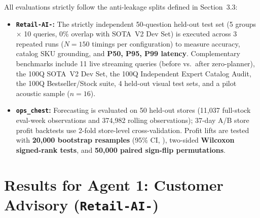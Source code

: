 All evaluations strictly follow the anti-leakage splits defined in Section~3.3:
\begin{itemize}
    \item \textbf{\texttt{Retail-AI-}:} The strictly independent 50-question held-out test set (5 groups $\times$ 10 queries, 0\% overlap with SOTA~V2 Dev Set) is executed across 3 repeated runs ($N=150$ timings per configuration) to measure accuracy, catalog SKU grounding, and \textbf{P50, P95, P99 latency}. Complementary benchmarks include 11 live streaming queries (before vs.\ after zero-planner), the 100Q SOTA~V2 Dev Set, the 100Q Independent Expert Catalog Audit, the 100Q Bestseller/Stock suite, 4 held-out visual test sets, and a pilot acoustic sample ($n=16$).
    \item \textbf{\texttt{ops\_chest}:} Forecasting is evaluated on 50 held-out stores (11,037 full-stock eval-week observations and 374,982 rolling observations); 37-day A/B store profit backtests use 2-fold store-level cross-validation. Profit lifts are tested with \textbf{20,000 bootstrap resamples} (95\% CI, ), two-sided \textbf{Wilcoxon signed-rank tests}, and \textbf{50,000 paired sign-flip permutations}.
\end{itemize}

\section{Results for Agent 1: Customer Advisory (\texttt{Retail-AI-})}


